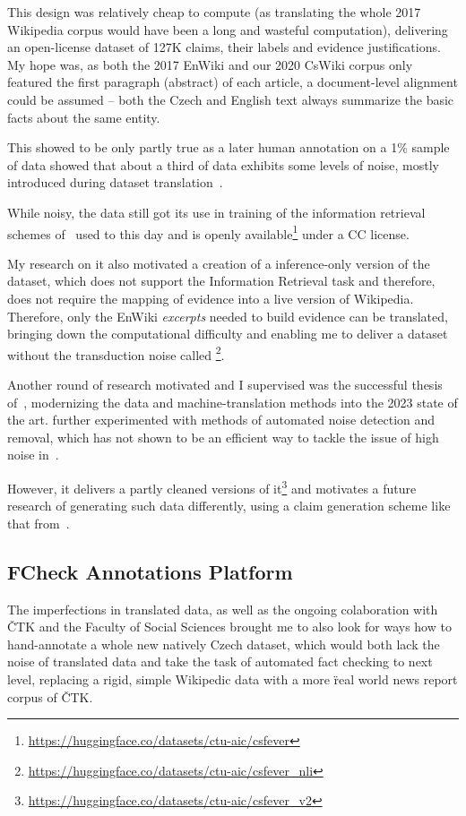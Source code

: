 This design was relatively cheap to compute (as translating the whole 2017 Wikipedia corpus would have been a long and wasteful computation), delivering an open-license dataset of 127K claims, their labels and evidence justifications. My hope was, as both the 2017 EnWiki and our 2020 CsWiki corpus only featured the first paragraph (abstract) of each article, a document-level alignment could be assumed -- both the Czech and English text always summarize the basic facts about the same entity.

This showed to be only partly true as a later human annotation on a 1\% sample of \FCZ data showed that about a third of data exhibits some levels of noise, mostly introduced during dataset translation~\cite{lrev}.

While noisy, the \FCZ data still got its use in training of the information retrieval schemes of~\cite{rypar,gazo,lrev} used to this day and is openly available\footnote{\url{https://huggingface.co/datasets/ctu-aic/csfever}} under a CC license.

My research on it also motivated a creation of a inference-only version of the dataset, which does not support the Information Retrieval task and therefore, does not require the mapping of evidence into a live version of Wikipedia.
Therefore, only the EnWiki \textit{excerpts} needed to build evidence can be translated, bringing down the computational difficulty and enabling me to deliver a dataset without the transduction noise called \FCZNLI\footnote{\url{https://huggingface.co/datasets/ctu-aic/csfever_nli}}. 

Another round of research \FCZ motivated and I supervised was the successful thesis of~\cite{mlynar}, modernizing the data and machine-translation methods into the 2023 state of the art.
\cite{mlynar} further experimented with methods of automated noise detection and removal, which has not shown to be an efficient way to tackle the issue of high noise in \FCZ.

However, it delivers a partly cleaned versions of it\footnote{\url{https://huggingface.co/datasets/ctu-aic/csfever_v2}} and motivates a future research of generating such data differently, using a claim generation scheme like that from~\cite{pan2021zeroshot}.


\subsection{FCheck Annotations Platform}
The imperfections in translated \FCZ data, as well as the ongoing colaboration with ČTK and the Faculty of Social Sciences brought me to also look for ways how to hand-annotate a whole new natively Czech dataset, which would both lack the noise of translated data and take the task of automated fact checking to next level, replacing a rigid, simple Wikipedic data with a more \"{real world} news report corpus of ČTK.

